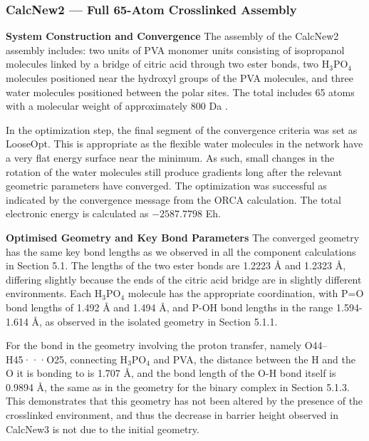 \documentclass[12pt,a4paper]{report}
\begin{document}
\subsubsection{CalcNew2 — Full 65-Atom Crosslinked Assembly}

\textbf{System Construction and Convergence}
The assembly of the CalcNew2 assembly includes: two units of PVA monomer units consisting of isopropanol molecules linked by a bridge of citric acid through two ester bonds, two H\(_3\)PO\(_4\) molecules positioned near the hydroxyl groups of the PVA molecules, and three water molecules positioned between the polar sites. The total includes 65 atoms with a molecular weight of approximately 800 Da \cite{18, 19, 77,78,79}.

In the optimization step, the final segment of the convergence criteria was set as LooseOpt. This is appropriate as the flexible water molecules in the network have a very flat energy surface near the minimum. As such, small changes in the rotation of the water molecules still produce gradients long after the relevant geometric parameters have converged. \cite{77,78,79} The optimization was successful as indicated by the convergence message from the ORCA calculation. The total electronic energy is calculated as \(-2587.7798\) Eh.

\textbf{Optimised Geometry and Key Bond Parameters}
The converged geometry has the same key bond lengths as we observed in all the component calculations in Section 5.1. The lengths of the two ester bonds are 1.2223 Å and 1.2323 Å, differing slightly because the ends of the citric acid bridge are in slightly different environments. Each H\(_3\)PO\(_4\) molecule has the appropriate coordination, with P=O bond lengths of 1.492 Å and 1.494 Å, and P-OH bond lengths in the range 1.594-1.614 Å, as observed in the isolated geometry in Section 5.1.1.\cite{76}

For the bond in the geometry involving the proton transfer, namely O44–H45···O25, connecting H\(_3\)PO\(_4\) and PVA, the distance between the H and the O it is bonding to is 1.707 Å, and the bond length of the O-H bond itself is 0.9894 Å, the same as in the geometry for the binary complex in Section 5.1.3. This demonstrates that this geometry has not been altered by the presence of the crosslinked environment, and thus the decrease in barrier height observed in CalcNew3 is not due to the initial geometry.\cite{97,98}
\end{document}
